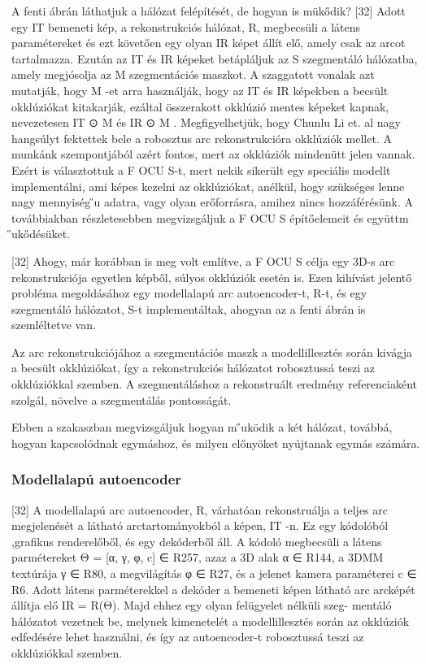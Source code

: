 \documentclass[12pt,a4]{article}
\begin{document}
 	A fenti ábrán láthatjuk a hálózat felépítését, de hogyan is mükődik? [32]
 	Adott egy IT bemeneti kép, a rekonstrukciós hálózat, R, megbecsüli a látens
 	paramétereket és ezt követően egy olyan IR képet állít elő, amely csak az
 	arcot tartalmazza. Ezután az IT és IR képeket betápláljuk az S szegmentáló
 	hálózatba, amely megjósolja az M szegmentációs maszkot. A szaggatott
 	vonalak azt mutatják, hogy M -et arra használják, hogy az IT és IR képekben
 	a becsült okklúziókat kitakarják, ezáltal összerakott okklúzió mentes képeket
 	kapnak, nevezetesen IT
 	⊙ M és IR
 	⊙ M .
 	Megfigyelhetjük, hogy Chunlu Li et. al nagy hangsúlyt fektettek bele a
 	robosztus arc rekonstrukcióra okklúziók mellet. A munkánk szempontjából
 	azért fontos, mert az okklúziók mindenütt jelen vannak. Ezért is választottuk
 	a F OCU S-t, mert nekik sikerült egy speciális modellt implementálni, ami
 	képes kezelni az okklúziókat, anélkül, hogy szükséges lenne nagy mennyiség ̋u
 	adatra, vagy olyan erőforrásra, amihez nincs hozzáférésünk.
 	A továbbiakban részletesebben megvizsgáljuk a F OCU S építőelemeit és
 	együttm ̋ukődésüket.
 	
 	[32] Ahogy, már korábban is meg volt említve, a F OCU S célja egy 3D-s
 	arc rekonstrukciója egyetlen képből, súlyos okklúziók esetén is. Ezen kihívást
 	jelentő probléma megoldásához egy modellalapú arc autoencoder-t, R-t, és
 	egy szegmentáló hálózatot, S-t implementáltak, ahogyan az a fenti ábrán is
 	szemléltetve van.
 	
 	Az arc rekonstrukciójához a szegmentációs maszk a modellillesztés során
 	kivágja a becsült okklúziókat, így a rekonstrukciós hálózatot robosztussá
 	teszi az okklúziókkal szemben. A szegmentáláshoz a rekonstruált eredmény
 	referenciaként szolgál, növelve a szegmentálás pontosságát.
 	
 	Ebben a szakaszban megvizsgáljuk hogyan m ̋uködik a két hálózat,
 	továbbá, hogyan kapcsolódnak egymáshoz, és milyen előnyöket nyújtanak
 	egymás számára.
 	
 	\subsubsection{Modellalapú autoencoder}
 	[32] A modellalapú arc autoencoder, R, várhatóan rekonstruálja a teljes arc
 	megjelenését a látható arctartományokból a képen, IT -n. Ez egy kódolóból
 	,grafikus renderelőből, és egy dekóderből áll. A kódoló megbecsüli a látens
 	parmétereket Θ = [α, γ, φ, c] ∈ R257, azaz a 3D alak α ∈ R144, a 3DMM
 	textúrája γ ∈ R80, a megvilágítás φ ∈ R27, és a jelenet kamera paraméterei
 	c ∈ R6. Adott látens parméterekkel a dekóder a bemeneti képen látható arc
 	arcképét állítja elő IR = R(Θ). Majd ehhez egy olyan felügyelet nélküli szeg-
 	mentáló hálózatot vezetnek be, melynek kimenetelét a modellillesztés során
 	az okklúziók edfedésére lehet használni, és így az autoencoder-t robosztussá
 	teszi az okklúziókkal szemben.
 	
\end{document}
